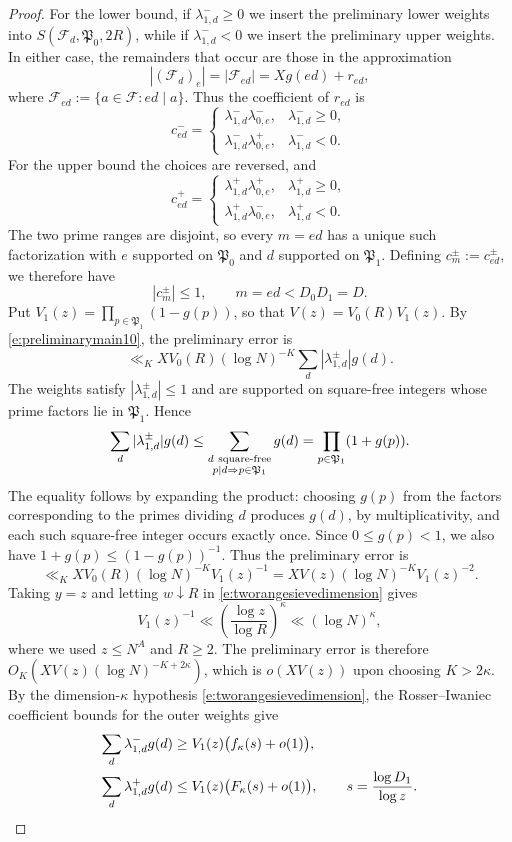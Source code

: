 \documentclass[12pt,reqno]{amsart}
\numberwithin{equation}{section}
\theoremstyle{definition}
\theoremstyle{remark}
\begin{document}
\begin{proof}
For the lower bound, if \(\lambda_{1,d}^-\geq0\) we insert the preliminary
lower weights into \(S(\mathcal F_d,\mathfrak P_0,2R)\), while if
\(\lambda_{1,d}^-<0\) we insert the preliminary upper weights.  In either
case, the remainders that occur are those in the approximation
\[
 |(\mathcal F_d)_e|
 =
 |\mathcal F_{ed}|
 =
 Xg(ed)+r_{ed},
\]
where $ \mathcal F_{ed}:=\{a\in\mathcal F:ed\mid a\}.$
Thus the coefficient of \(r_{ed}\) is
\[
 c_{ed}^-=
 \begin{cases}
  \lambda_{1,d}^-\lambda_{0,e}^-,&\lambda_{1,d}^-\geq0,\\
  \lambda_{1,d}^-\lambda_{0,e}^+,&\lambda_{1,d}^-<0.
 \end{cases}
\]
For the upper bound the choices are reversed, and
\[
 c_{ed}^+=
 \begin{cases}
  \lambda_{1,d}^+\lambda_{0,e}^+,&\lambda_{1,d}^+\geq0,\\
  \lambda_{1,d}^+\lambda_{0,e}^-,&\lambda_{1,d}^+<0.
 \end{cases}
\]
The two prime ranges are disjoint, so every \(m=ed\) has a unique such
factorization with \(e\) supported on \(\mathfrak P_0\) and \(d\) supported
on \(\mathfrak P_1\).  Defining \(c_m^\pm:=c_{ed}^\pm\), we therefore have
\[
 |c_m^\pm|\leq1,\qquad m=ed<D_0D_1=D.
\]
Put \(V_1(z)=\prod_{p\in\mathfrak P_1}(1-g(p))\), so that
\(V(z)=V_0(R)V_1(z)\).
By \eqref{e:preliminarymain10}, the preliminary error is
\[
 \ll_K
 X V_0(R)(\log N)^{-K}
 \sum_d|\lambda_{1,d}^{\pm}|g(d).
\]
The weights satisfy \(|\lambda_{1,d}^{\pm}|\leq1\) and are
supported on square-free integers whose prime factors lie in
\(\mathfrak P_1\). Hence
\[
 \sum_d|\lambda_{1,d}^{\pm}|g(d)
 \leq
 \sum_{\substack{d\ {\rm square\text{-}free}\\
                 p\mid d\Rightarrow p\in\mathfrak P_1}}g(d)
 =
 \prod_{p\in\mathfrak P_1}(1+g(p)).
\]
The equality follows by expanding the product: choosing \(g(p)\)
from the factors corresponding to the primes dividing \(d\)
produces \(g(d)\), by multiplicativity, and each such square-free
integer occurs exactly once.
Since \(0\leq g(p)<1\), we also have
\(1+g(p)\leq(1-g(p))^{-1}\).
Thus the preliminary error is
\[
 \ll_K
 X V_0(R)(\log N)^{-K}V_1(z)^{-1}
 =
 X V(z)(\log N)^{-K}V_1(z)^{-2}.
\]
Taking \(y=z\) and letting \(w\downarrow R\) in
\eqref{e:tworangesievedimension} gives
\[
 V_1(z)^{-1}
 \ll \left(\frac{\log z}{\log R}\right)^\kappa
 \ll(\log N)^\kappa,
\]
where we used \(z\leq N^A\) and \(R\geq2\).
The preliminary error is therefore
\(O_K(XV(z)(\log N)^{-K+2\kappa})\), which is
\(o(XV(z))\) upon choosing \(K>2\kappa\).
By the dimension-\(\kappa\) hypothesis
\eqref{e:tworangesievedimension}, the Rosser--Iwaniec coefficient
bounds for the outer weights give
\begin{align}\label{e:outercoefficients10}
 \sum_d\lambda_{1,d}^-g(d)
 &\geq V_1(z)\bigl(f_\kappa(s)+o(1)\bigr),\notag\\
 \sum_d\lambda_{1,d}^+g(d)
 &\leq V_1(z)\bigl(F_\kappa(s)+o(1)\bigr),
 \qquad
 s=\frac{\log D_1}{\log z}.
\end{align}


\end{proof}
\end{document}
